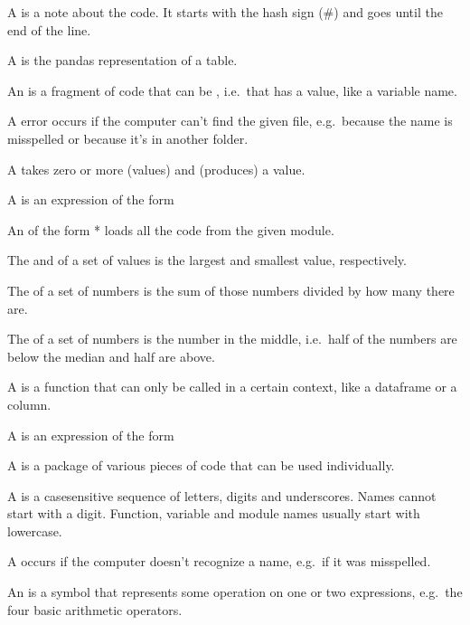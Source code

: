 \documentclass[letterpaper,10pt,english]{sphinxmanual}
\begin{document}
A  is a note about the code. It starts with the hash sign (\#) and goes until the end of the line.

A  is the pandas representation of a table.

An  is a fragment of code that can be  , i.e. that has a value, like a variable name.

A  error occurs if the computer can’t find the given file, e.g. because the name is misspelled or because it’s in another folder.

A  takes zero or more  (values) and  (produces) a value.

A  is an expression of the form 

An  of the form  * loads all the code from the given module.

The  and  of a set of values is the largest and smallest value, respectively.

The  of a set of numbers is the sum of those numbers divided by how many there are.

The  of a set of numbers is the number in the middle, i.e. half of the numbers are below the median and half are above.

A  is a function that can only be called in a certain context, like a dataframe or a column.

A  is an expression of the form 

A  is a package of various pieces of code that can be used individually.

A  is a case\sphinxhyphen{}sensitive sequence of letters, digits and underscores. Names cannot start with a digit. Function, variable and module names usually start with lowercase.

A  occurs if the computer doesn’t recognize a name, e.g. if it was misspelled.

An  is a symbol that represents some operation on one or two expressions, e.g. the four basic arithmetic operators.
\end{document}
